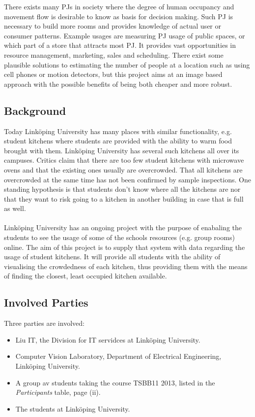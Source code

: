 There exists many PJs in society where the degree of human occupancy and movement flow is desirable to know as basis for decision making. Such PJ is necessary to build more rooms and provides knowledge of actual user or consumer patterns. Example usages are measuring PJ usage of public spaces, or which part of a store that attracts most PJ. It provides vast opportunities in resource management, marketing, sales and scheduling. There exist some plausible solutions to estimating the number of people at a location such as using cell phones or motion detectors, but this project aims at an image based approach with the possible benefits of being both cheaper and more robust.

\subsection{Background}
Today Linköping University has many places with similar functionality, e.g. student kitchens where students are provided with the ability to warm food brought with them. Linköping University has several such kitchens all over its campuses. Critics claim that there are too few student kitchens with microwave ovens and that the existing ones usually are overcrowded. That all kitchens are overcrowded at the same time has not been confirmed by sample inspections. One standing hypothesis is that students don't know where all the kitchens are nor that they want to risk going to a kitchen in another building in case that is full as well.\\
\\
Linköping University has an ongoing project with the purpose of enabaling the students to see the usage of some of the schools resources (e.g. group rooms) online. The aim of this project is to supply that system with data regarding the usage of student kitchens. It will provide all students with the ability of visualising the crowdedness of each kitchen, thus providing them with the means of finding the closest, least occupied kitchen available.

\subsection{Involved Parties}
Three parties are involved:
\begin{itemize}
\item Liu IT, the Division for IT servidces at Linköping University.
\item Computer Vision Laboratory, Department of Electrical Engineering, Linköping University.
\item A group av students taking the course TSBB11 2013, listed in the \textit{Participants} table, page (ii).
\item The students at Linköping University.
\end{itemize}

